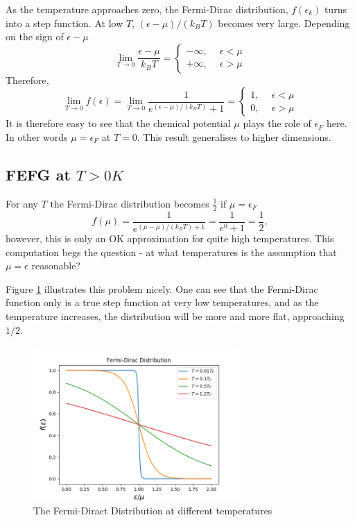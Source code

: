 \documentclass[11pt]{amsart}
\begin{document}
As the temperature approaches zero, the Fermi-Dirac distribution, $f(\epsilon_k)$ turns into a step function. At low $T$, $(\epsilon-\mu)/(k_B T)$ becomes very large. Depending on the sign of $\epsilon - \mu$
\begin{equation}
\lim_{T \to 0} \frac{\epsilon - \mu}{k_B T} = 
\begin{cases}
	- \infty, \ & \ \epsilon < \mu \\
	+ \infty, \ & \ \epsilon > \mu
\end{cases}
\end{equation}
Therefore,
\begin{equation}
\lim_{T\to 0} f(\epsilon) = \lim_{T\to 0} \frac{1}{e^{(\epsilon -\mu)/(k_B T)} + 1} =
\begin{cases}
	1, \ & \ \epsilon < \mu \\
	0, \ & \ \epsilon > \mu 
\end{cases}
\end{equation}
It is therefore easy to see that the chemical potential $\mu$ plays the role of $\epsilon_F$ here. In other words $\mu = \epsilon_F$ at $T=0$. This result generalises to higher dimensions.

\subsection{FEFG at $T>0K$}

For any $T$ the Fermi-Dirac distribution becomes $\frac{1}{2}$ if $\mu = \epsilon_F$
\begin{equation}
f(\mu) = \frac{1}{e^{(\mu-\mu)/(k_B T) + 1}} = \frac{1}{e^0 + 1} = \frac{1}{2},
\end{equation}
however, this is only an OK approximation for quite high temperatures. This computation begs the question - at what temperatures is the assumption that $\mu = \epsilon$ reasonable?

Figure \ref{fig:fdd1} illustrates this problem nicely. One can see that the Fermi-Dirac function only is a true step function at very low temperatures, and as the temperature increases, the distribution will be more and more flat, approaching $1/2$.

\begin{figure}
\centering
	\includegraphics[width = 0.7\textwidth]{fdd1.png}
	\caption{The Fermi-Diract Distribution at different temperatures}
	\label{fig:fdd1}
\end{figure}
\end{document}
